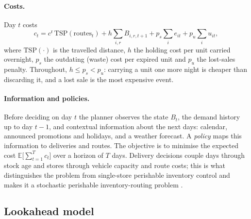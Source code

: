 \paragraph{Costs.} Day $t$ costs
\begin{equation}\label{eq:daycost}
  c_t = c^{\mathrm{r}}\,\mathrm{TSP}(\text{routes}_t) + h\sum_{i,r}B_{i,r,t+1} + p_s\sum_i e_{it} + p_u\sum_i u_{it},
\end{equation}
where $\mathrm{TSP}(\cdot)$ is the travelled distance, $h$ the holding cost per unit carried overnight, $p_s$ the outdating (waste) cost per expired unit and $p_u$ the lost-sales penalty. Throughout, $h\le p_s<p_u$: carrying a unit one more night is cheaper than discarding it, and a lost sale is the most expensive event.

\paragraph{Information and policies.} Before deciding on day $t$ the planner observes the state $B_t$, the demand history up to day $t-1$, and contextual information about the next days: calendar, announced promotions and holidays, and a weather forecast. A \emph{policy} maps this information to deliveries and routes. The objective is to minimise the expected cost $\mathbb{E}\big[\sum_{t=1}^{T} c_t\big]$ over a horizon of $T$ days. Delivery decisions couple days through stock age and stores through vehicle capacity and route costs; this is what distinguishes the problem from single-store perishable inventory control \citep{nahmias1982perishable,haijema2019improved} and makes it a stochastic perishable inventory-routing problem \citep{crama2018stochastic}.

\subsection{Lookahead model}\label{sec:lookahead}

